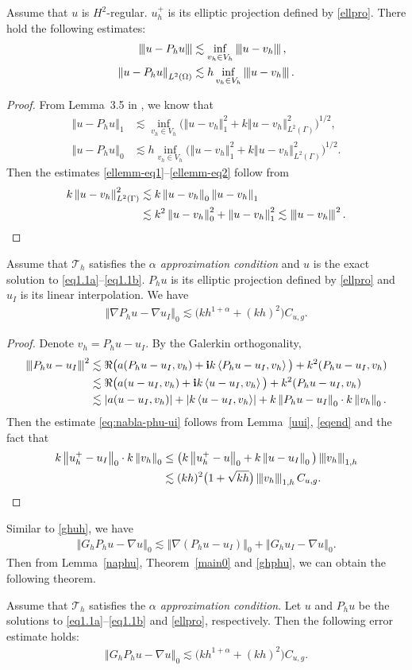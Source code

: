 \documentclass[leqno,final]{siamltex}
\numberwithin{equation}{section}
\newcommand{\norm}[1]{\left\Vert#1\right\Vert}
\newcommand{\norme}[1]{\left\Vert{\hskip -2.7pt}\left\vert #1 \right\vert{\hskip -2.7pt}\right\Vert}
\newcommand{\abs}[1]{\left\vert#1\right\vert}
\newcommand{\pd}[1]{\left\langle #1\right\rangle}
\newcommand{\nn}{\nonumber}
\newcommand{\ls}{\lesssim}
\newcommand{\al}{\alpha}
\newcommand{\Ga}{\Gamma}
\newcommand{\na}{\nabla}
\newcommand{\Om}{\Omega}
\renewcommand{\i}{{\rm\mathbf i}}
\newcommand{\T}{\mathcal{T}}
\newcommand{\eq}[1]{\begin{align}#1\end{align}}
\newcommand{\eqn}[1]{\begin{align*}#1\end{align*}}
\begin{document}
\begin{lemma} \label{ellemm}
Assume that $u$ is $H^2$-regular. $u_h^+$ is its elliptic projection defined by \eqref{ellpro}.
There hold the following estimates:
\eq{
\norme{u-P_hu} &\ls \inf_{v_h\in V_h} \norme{u-v_h}, \label{ellemm-eq1}\\
\norm{u-P_hu}_{L^2(\Om)} &\ls h\inf_{v_h\in V_h}\norme{u-v_h}.\label{ellemm-eq2}
}
\end{lemma}
\begin{proof}
From Lemma~3.5 in \cite{zw}, we know that
\eqn{
\norm{u-P_hu}_1 &\ls \inf_{v_h\in V_h} \big(\norm{u-v_h}_1^2+k\norm{u-v_h}_{L^2(\Ga)}^2\big)^{1/2},\\
\norm{u-P_hu}_0 &\ls h \inf_{v_h\in V_h} \big(\norm{u-v_h}_1^2+k\norm{u-v_h}_{L^2(\Ga)}^2\big)^{1/2}.
}
Then the estimates \eqref{ellemm-eq1}--\eqref{ellemm-eq2} follow from
\eqn{ k\norm{u-v_h}_{L^2(\Ga)}^2 &\ls k\norm{u-v_h}_0\norm{u-v_h}_1\\
&\ls k^2\norm{u-v_h}_0^2 + \norm{u-v_h}_1^2 \ls \norme{u-v_h}^2.
}
\end{proof}

\begin{lemma}\label{naphu}
Assume that $\T_h$ satisfies the \emph{$\al$ approximation condition} and $u$ is the exact solution to \eqref{eq1.1a}--\eqref{eq1.1b}.
$P_hu$ is its elliptic projection defined by \eqref{ellpro} and $u_I$ is its linear interpolation. We have
\eq{
\norm{\na P_hu-\na u_I}_0 \ls \big(kh^{1+\al}+(kh)^2\big) C_{u,g}. \label{eq:nabla-phu-ui}
}
\end{lemma}
\begin{proof}
Denote $v_h=P_hu-u_I$. By the Galerkin orthogonality,
\eq{ \norme{P_hu-u_I}^2 &\ls\Re\big( a(P_hu-u_I,v_h) + \i k\pd{P_hu-u_I,v_h} \big) + k^2(P_hu-u_I,v_h)\\
&\ls\Re\big( a(u-u_I,v_h) + \i k\pd{u-u_I,v_h} \big) + k^2(P_hu-u_I,v_h)\nn\\
&\ls \abs{a(u-u_I,v_h)} + \abs{k\pd{u-u_I,v_h}} + k\norm{P_hu-u_I}_0\cdot k\norm{v_h}_0. \nn}
Then the estimate \eqref{eq:nabla-phu-ui} follows from Lemma~\ref{uui}, \eqref{eqend} and the fact that
\eqn{ k\norm{u_h^+-u_I}_0\cdot k\norm{v_h}_0 &\leq \big(k\norm{u_h^+-u}_0+k\norm{u-u_I}_0\big)\norme{v_h}_{1,h}\\
&\ls (kh)^2\big(1+\sqrt{kh}\big)\norme{v_h}_{1,h} C_{u,g}. }
\end{proof}

Similar to \eqref{ghuh}, we have
\eq{ \norm{G_hP_hu-\na u}_0 \ls \norm{\na(P_hu-u_I)}_0 + \norm{G_hu_I-\na u}_0.  \label{ghphu}}
Then from Lemma~\ref{naphu}, Theorem~\ref{main0} and \eqref{ghphu}, we can obtain the following theorem.
\begin{theorem} \label{main2}
Assume that $\T_h$ satisfies the \emph{$\al$ approximation condition}.
Let $u$ and $P_hu$ be the solutions to \eqref{eq1.1a}--\eqref{eq1.1b} and \eqref{ellpro}, respectively.
Then the following error estimate holds:
\eq{ \norm{G_hP_hu-\na u}_0\ls \big(kh^{1+\al}+(kh)^2\big)  C_{u,g}. \label{phusup} }
\end{theorem}
\end{document}

